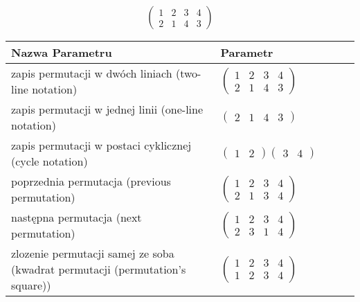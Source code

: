 \documentclass[12pt]{article}
\begin{document}
\subsection{}
\begin{center}
\[
\begin{pmatrix}
	1 & 2 & 3 & 4 \\ 
	2 & 1 & 4 & 3 
\end{pmatrix}
\]

\begin{tabular}{|m{0.6\linewidth}|m{0.4\linewidth}|}
	\hline
	Nazwa Parametru & Parametr \\
	\hline
	zapis permutacji w dwóch liniach (two-line notation) & $\begin{pmatrix} 1 & 2 & 3 & 4 \\ 
2 & 1 & 4 & 3 \end{pmatrix}$ \\ 
	\hline
	zapis permutacji w jednej linii (one-line notation) & $\begin{pmatrix} 2 & 1 & 4 & 3 \end{pmatrix}$ \\ 
	\hline
	zapis permutacji w postaci cyklicznej (cycle notation) & $\begin{pmatrix} 1 & 2 \end{pmatrix} \begin{pmatrix} 3 & 4 \end{pmatrix} $ \\ 
	\hline
	poprzednia permutacja (previous permutation) & $\begin{pmatrix} 1 & 2 & 3 & 4 \\ 
2 & 1 & 3 & 4 \end{pmatrix}$ \\ 
	\hline
	następna permutacja (next permutation) & $\begin{pmatrix} 1 & 2 & 3 & 4 \\ 
2 & 3 & 1 & 4 \end{pmatrix}$ \\ 
	\hline
	zlozenie permutacji samej ze soba (kwadrat permutacji (permutation's square)) & $\begin{pmatrix} 1 & 2 & 3 & 4 \\ 
1 & 2 & 3 & 4 \end{pmatrix}$ \\ 
	\hline
\end{tabular}
\end{center}
\end{document}
